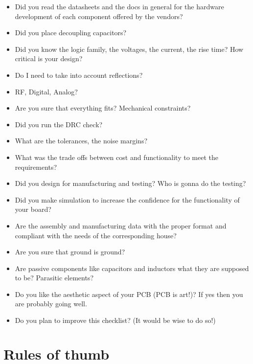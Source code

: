 \documentclass[12pt]{article}
\begin{document}
\begin{itemize}
	\item Did you read the datasheets and the docs in general for the hardware development of each component offered by the vendors?
	\item Did you place decoupling capacitors?
	\item Did you know the logic family, the voltages, the current, the rise time? How critical is your design?
	\item Do I need to take into account reflections? 
	\item RF, Digital, Analog?
	\item Are you sure that everything fits? Mechanical constraints?
	\item Did you run the DRC check?
	\item What are the tolerances, the noise margins? 
	\item What was the trade offs between cost and functionality to meet the requirements?
	\item Did you design for manufacturing and testing? Who is gonna do the testing?
	\item Did you make simulation to increase the confidence for the functionality of your board? 
	\item Are the assembly and manufacturing data with the proper format and compliant with the needs of the corresponding house?
	\item Are you sure that ground is ground?
	\item Are passive components like capacitors and inductors what they are supposed to be? Parasitic elements?
	\item Do you like the aesthetic aspect of your PCB (PCB is art!)? If yes then you are probably going well.
	\item Do you plan to improve this checklist? (It would be wise to do so!)
\end{itemize}

\section{Rules of thumb}
\end{document}
